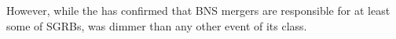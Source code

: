 %
%
%
However, while the \GRB{} has confirmed that \ac{BNS} mergers are responsible 
for at least some of \acp{SGRB}, \GRB{} was dimmer than any other event of its class. 
